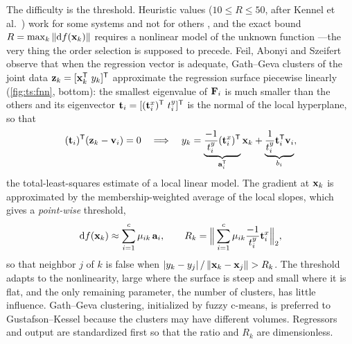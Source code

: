 The difficulty is the threshold. Heuristic values ($10\le R\le50$, after Kennel et al.\ \cite{kennel:1992:fnn}) work for some systems and not for others \cite{bomberger:1998:narx}, and the exact bound $R=\max_k\left\lVert \mathrm{d}f(\mathbf{x}_k) \right\rVert$ requires a nonlinear model of the unknown function \cite{rhodes:1998:fnn}---the very thing the order selection is supposed to precede. Feil, Abonyi and Szeifert \cite{feil:2003:fnn,feil:2004:fnn} observe that when the regression vector is adequate, Gath--Geva clusters of the joint data $\mathbf{z}_k=[\mathbf{x}_k^{\mathsf{T}}\ y_k]^{\mathsf{T}}$ approximate the regression surface piecewise linearly (\cref{fig:ts:fnn}, bottom): the smallest eigenvalue of $\mathbf{F}_i$ is much smaller than the others and its eigenvector $\mathbf{t}_i=[(\mathbf{t}^x_i)^{\mathsf{T}}\ t^y_i]^{\mathsf{T}}$ is the normal of the local hyperplane, so that
\begin{equation}
  (\mathbf{t}_i)^{\mathsf{T}}(\mathbf{z}_k-\mathbf{v}_i)=0\quad\Longrightarrow\quad
  y_k=\underbrace{\frac{-1}{t^y_i}(\mathbf{t}^x_i)^{\mathsf{T}}}_{\mathbf{a}_i^{\mathsf{T}}}\mathbf{x}_k+\underbrace{\frac{1}{t^y_i}\mathbf{t}_i^{\mathsf{T}}\mathbf{v}_i}_{b_i},
  \label{eq:ts:localslope}
\end{equation}
the total-least-squares estimate of a local linear model. The gradient at $\mathbf{x}_k$ is approximated by the membership-weighted average of the local slopes, which gives a \emph{point-wise} threshold,
\begin{equation}
  \mathrm{d}f(\mathbf{x}_k)\approx\sum_{i=1}^{c}\mu_{ik}\,\mathbf{a}_i,\qquad
  R_k=\Big\lVert\sum_{i=1}^{c}\mu_{ik}\frac{-1}{t^y_i}\mathbf{t}^x_i\Big\rVert_2,
  \label{eq:ts:Rk}
\end{equation}
so that neighbor $j$ of $k$ is false when $\left\lvert y_k-y_j \right\rvert/\left\lVert \mathbf{x}_k-\mathbf{x}_j \right\rVert>R_k$. The threshold adapts to the nonlinearity, large where the surface is steep and small where it is flat, and the only remaining parameter, the number of clusters, has little influence. Gath--Geva clustering, initialized by fuzzy c-means, is preferred to Gustafson--Kessel because the clusters may have different volumes. Regressors and output are standardized first so that the ratio and $R_k$ are dimensionless.

